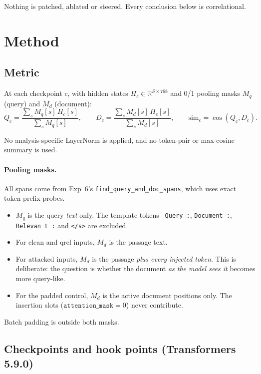 \documentclass[11pt]{article}
\newcommand{\qsim}{\ensuremath{\mathrm{sim}}}
\begin{document}
Nothing is patched, ablated or steered. Every conclusion below is correlational.

\section{Method}

\subsection{Metric}

At each checkpoint $c$, with hidden states $H_c\in\mathbb{R}^{S\times768}$ and 0/1
pooling masks $M_q$ (query) and $M_d$ (document):
\[
Q_c=\frac{\sum_s M_q[s]\,H_c[s]}{\sum_s M_q[s]},\qquad
D_c=\frac{\sum_s M_d[s]\,H_c[s]}{\sum_s M_d[s]},\qquad
\qsim_c=\cos(Q_c,D_c).
\]

No analysis-specific LayerNorm is applied, and no token-pair or max-cosine summary is
used.

\paragraph{Pooling masks.} All spans come from Exp~6's \texttt{find\_query\_and\_doc\_spans},
which uses exact token-prefix probes.
\begin{itemize}[nosep]
  \item $M_q$ is the query \emph{text} only. The template tokens
        \texttt{\textvisiblespace{} Query :}, \texttt{\textvisiblespace{}Document :}, \texttt{\textvisiblespace{}Relevan t :} and \texttt{</s>}
        are excluded.
  \item For clean and qrel inputs, $M_d$ is the passage text.
  \item For attacked inputs, $M_d$ is the passage \emph{plus every injected token}.
        This is deliberate: the question is whether the document \emph{as the model sees
        it} becomes more query-like.
  \item For the padded control, $M_d$ is the active document positions only. The
        insertion slots ($\texttt{attention\_mask}=0$) never contribute.
\end{itemize}
Batch padding is outside both masks.

\subsection{Checkpoints and hook points (Transformers 5.9.0)}
\end{document}
